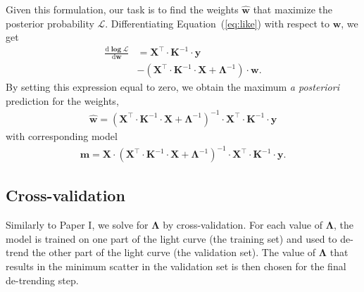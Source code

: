 \documentclass[]{emulateapj}
\begin{document}
Given this formulation, our task is to find the weights $\mathbf{\hat{w}}$ that maximize 
the posterior probability 
$\mathcal{L}$. Differentiating 
Equation~(\ref{eq:like}) with respect to $\mathbf{w}$, we get
%
\begin{align}
\label{eq:gradlike}
\frac{\mathrm{d}\mathbf{\log\mathcal{L}}}{\mathrm{d}\mathbf{w}} &= 
%
\mathbf{X}^\top \cdot \mathbf{K}^{-1} \cdot \mathbf{y} \nonumber\\
%
&- \left( \mathbf{X}^\top \cdot \mathbf{K}^{-1} \cdot \mathbf{X} + \mathbf{\Lambda}^{-1} \right) \cdot \mathbf{w}.
\end{align}
%
By setting this expression equal to zero, we obtain the maximum \emph{a posteriori} prediction 
for the weights,
%
\begin{align}
\label{eq:what}
\mathbf{\hat{w}} = 
%
\left( \mathbf{X}^\top \cdot \mathbf{K}^{-1} \cdot \mathbf{X} + \mathbf{\Lambda}^{-1} \right)^{-1}
%
\cdot \mathbf{X}^\top \cdot \mathbf{K}^{-1} \cdot \mathbf{y}
\end{align}
with corresponding model
%
\begin{align}
\label{eq:model_slow}
\mathbf{m} = 
%
\mathbf{X} \cdot
%
\left( \mathbf{X}^\top \cdot \mathbf{K}^{-1} \cdot \mathbf{X} + \mathbf{\Lambda}^{-1} \right)^{-1}
%
\cdot \mathbf{X}^\top \cdot \mathbf{K}^{-1} \cdot \mathbf{y}.
\end{align}

\subsection{Cross-validation}
\label{sec:crossval}
Similarly to Paper I, we solve for $\mathbf{\Lambda}$ by cross-validation. For each value
of $\mathbf{\Lambda}$, the model is trained on one part of the light curve (the training set)
and used to de-trend the other part of the light curve (the validation set). The value of 
$\mathbf{\Lambda}$ that results in the minimum scatter in the validation set is then chosen for
the final de-trending step. 
\end{document}
